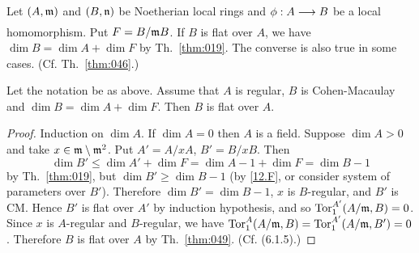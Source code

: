 \documentclass[../main]{subfiles}
\begin{document}
\newparagraph
Let $(A,\mathfrak{m})$ and $(B,\mathfrak{n})$ be Noetherian local rings and $\phi:A\varrightarrow{}B$ be a local homomorphism. Put $F = B/\mathfrak{m}B$. If $B$ is flat over $A$, we have \newline $\dim B = \dim A + \dim F$ by Th.~\ref{thm:019}. The converse is also true in some cases. (Cf. Th.~\ref{thm:046}.)

\begin{theorem}
\label{thm:081}
    Let the notation be as above. Assume that $A$ is regular, $B$ is Cohen-Macaulay and $\dim B = \dim A + \dim F$. Then $B$ is flat over $A$.
\end{theorem}
\begin{proof}
    Induction on $\dim A$. If $\dim A = 0$ then $A$ is a field. Suppose $\dim A>0$ and take $x\in \mathfrak{m}\setminus \mathfrak{m}^2$. Put $A' = A/xA$, $B'=B/xB$. Then \[\dim B' \le \dim A' + \dim F = \dim A - 1 + \dim F = \dim B - 1\] by Th.~\ref{thm:019}, but $\dim B'\ge \dim B - 1$ (by \ref{12.F}, or consider system of parameters over $B'$). Therefore $\dim B' = \dim B - 1$, $x$ is $B$-regular, and $B'$ is CM. Hence $B'$ is flat over $A'$ by induction hypothesis, and so $\operatorname{Tor}^{A'}_1(A/\mathfrak{m}, B)=0$. Since $x$ is $A$-regular and $B$-regular, we have $\operatorname{Tor}^A_1(A/\mathfrak{m}, B) = \operatorname{Tor}^{A'}_1(A/\mathfrak{m}, B') = 0$. Therefore $B$ is flat over $A$ by Th.~\ref{thm:049}. (Cf. \cite{egaIV} (6.1.5).)
\end{proof}
\end{document}
